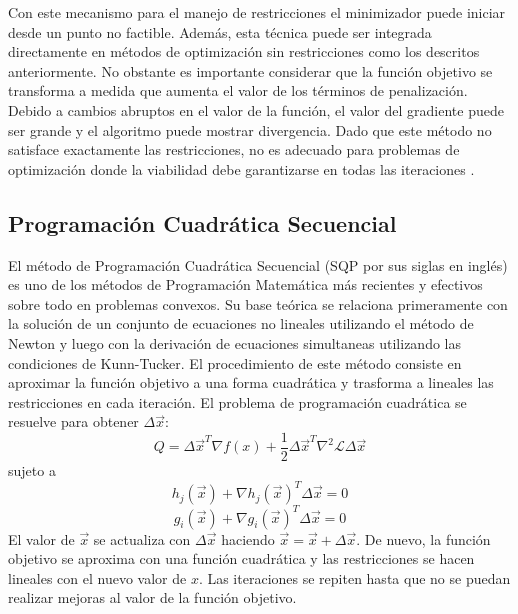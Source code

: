 Con este mecanismo para el manejo de restricciones el minimizador puede iniciar desde un punto no factible. Además, esta técnica puede ser integrada directamente en métodos de optimización sin restricciones como los descritos anteriormente. No obstante es importante considerar que la  función objetivo se transforma a medida que aumenta el valor de los términos de penalización. Debido a cambios abruptos en el valor de la función, el valor del gradiente puede ser grande y el algoritmo puede mostrar divergencia. Dado que este método no satisface exactamente las restricciones, no es adecuado para problemas de optimización donde la viabilidad debe garantizarse en todas las iteraciones \cite{arora_optimization:_2015}.

\subsection{Programación Cuadrática Secuencial} \label{sec:Programación Cuadrática Secuencial}
El método de Programación Cuadrática Secuencial (SQP por sus siglas en inglés) es uno de los métodos de Programación Matemática más recientes y efectivos sobre todo en problemas convexos. Su base teórica se relaciona primeramente con la solución de un conjunto de ecuaciones no lineales utilizando el método de Newton y luego con la derivación de ecuaciones simultaneas utilizando las condiciones de Kunn-Tucker. El procedimiento de este método consiste en aproximar la función objetivo a una forma cuadrática y trasforma a lineales las restricciones en cada iteración. El problema de programación cuadrática se resuelve para obtener $\Delta \vec{x}$:
\begin{equation}
Q=\Delta \vec{x}^T \nabla f(x)+ \frac{1}{2}\Delta \vec{x}^T \nabla^2 \mathcal{L} \Delta \vec{x}
\end{equation}
sujeto a
\begin{equation}
h_j(\vec{x})+ \nabla h_j(\vec{x})^T \Delta \vec{x}=0
\end{equation}
\begin{equation}
g_i(\vec{x})+ \nabla g_i(\vec{x})^T \Delta \vec{x}=0
\end{equation}
El valor de $\vec{x}$ se actualiza con $\Delta \vec{x}$ haciendo  $\vec{x}=\vec{x}+\Delta \vec{x}$. De nuevo, la función objetivo se aproxima con una función cuadrática y las restricciones se hacen lineales con el nuevo valor de $x$. Las iteraciones se repiten hasta que no se puedan realizar mejoras al valor de la función objetivo.
